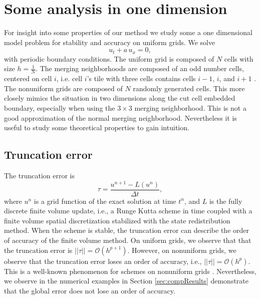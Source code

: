 \section{Some analysis in one dimension}\label{sec:theory}

For insight into some properties of our method
we study some a one dimensional model problem for stability and
accuracy on uniform grids.
We solve
$$
u_t + a \, u_x = 0,
$$
with periodic boundary conditions.  
The uniform grid is composed of $N$ cells with size $h = \frac{1}{N}$.
The merging neighborhoods are composed of an odd number cells, 
centered on cell $i$, i.e. cell $i$'s tile with three cells  
contains cells $i-1$, $i$, and $i+1$ .
The nonuniform grids are composed of $N$ randomly generated cells.
This more closely mimics the situation in two dimensions along the cut cell
embedded boundary, especially when using the $3\times3$ merging neighborhood.
This is not a good approximation of the normal merging neighborhood.
Nevertheless it is useful to study some theoretical properties to gain
intuition.


\subsection{Truncation error}
The truncation error is
$$
\tau = \frac{u^{n+1}- L(u^n)}{\Delta t},
$$
where $u^n$ is a grid function of the exact solution at time $t^n$, 
and $L$ is the fully discrete finite volume update, i.e., a Runge Kutta scheme in time coupled with a finite volume spatial discretization stabilized with the state redistribution method.
When the scheme is stable, the truncation error can describe the 
order of accuracy of the finite volume method.
On uniform grids, we observe that that the truncation error 
is $||\tau|| = \mathcal{O}(h^{p+1})$.  
However, on nonuniform grids, we observe that the truncation error loses an order of accuracy, i.e., $||\tau|| = \mathcal{O}(h^{p})$.  
This is a well-known phenomenon for schemes on nonuniform grids \cite{}.
Nevertheless, we observe in the numerical examples in 
Section \ref{sec:compResults} demonstrate that the global error does not lose an order of
accuracy.

